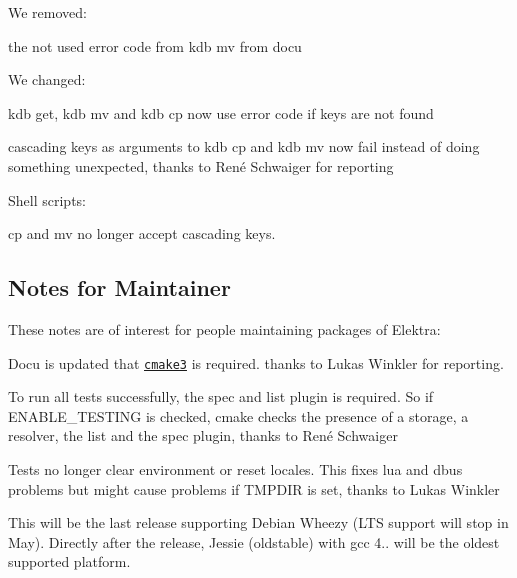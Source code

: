 We removed\+:


\begin{DoxyItemize}
\item the not used error code {} from {\ttfamily kdb mv} from docu
\end{DoxyItemize}

We changed\+:


\begin{DoxyItemize}
\item {\ttfamily kdb get}, {\ttfamily kdb mv} and {\ttfamily kdb cp} now use error code {} if keys are not found
\item cascading keys as arguments to {\ttfamily kdb cp} and {\ttfamily kdb mv} now fail instead of doing something unexpected, thanks to René Schwaiger for reporting
\end{DoxyItemize}

Shell scripts\+:


\begin{DoxyItemize}
\item cp and mv no longer accept cascading keys.
\end{DoxyItemize}

\subsection*{Notes for Maintainer}

These notes are of interest for people maintaining packages of Elektra\+:


\begin{DoxyItemize}
\item Docu is updated that \href{https://cmake.org/cmake/help/v3.0/}{\tt cmake3} is required. thanks to Lukas Winkler for reporting.
\item To run all tests successfully, the {\ttfamily spec} and {\ttfamily list} plugin is required. So if {\ttfamily E\+N\+A\+B\+L\+E\+\_\+\+T\+E\+S\+T\+I\+NG} is checked, cmake checks the presence of a storage, a resolver, the list and the spec plugin, thanks to René Schwaiger
\item Tests no longer clear environment or reset locales. This fixes lua and dbus problems but might cause problems if T\+M\+P\+D\+IR is set, thanks to Lukas Winkler
\item This will be the last release supporting Debian Wheezy (L\+TS support will stop in May). Directly after the release, Jessie (oldstable) with gcc 4.. will be the oldest supported platform.
\end{DoxyItemize}

